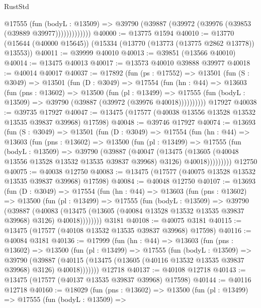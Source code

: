 \begin{lexlean}{RustStd}
\begin{coremodule}
                @17555
                  (fun (bodyL : @13509) =>
                  @39790 (@39887 (@39972 (@39976 (@39853 (@39889 @39977)))))))))))))
@40000 := @13775 @1594
@40010 := @13770 (@15644 (@40000 @15645)) (@15334 (@13770 (@13773 (@13775 @2862 @13778)) @13553))
@40011 := @39999 @40010
@40013 := @39851 (@13566 @40010)
@40014 := @13475 @40013
@40017 := @13573 @40010 @39888 @39977
@40018 := @40014 @40017
@40037 := @17892
    (fun (ps : @17552) =>
    @13501
      (fun (S : @3049) =>
      @13501
        (fun (D : @3049) =>
        @17554
          (fun (hn : @44) =>
          @13603
            (fun (pns : @13602) =>
            @13500
              (fun (pl : @13499) =>
              @17555 (fun (bodyL : @13509) => @39790 (@39887 (@39972 (@39976 @40018))))))))))
    @17927
@40038 := @39735 @17927
@40047 := @13475 (@17577 (@40038 @13556 @13528 @13532 @13535 @39837 @39968) @17598)
@40048 := @39746 @17927
@40074 := @13693
    (fun (S : @3049) =>
    @13501
      (fun (D : @3049) =>
      @17554
        (fun (hn : @44) =>
        @13603
          (fun (pns : @13602) =>
          @13500
            (fun (pl : @13499) =>
            @17555
              (fun (bodyL : @13509) =>
              @39790
                (@39887
                  (@40047
                    (@13475
                      (@13605 (@40048 @13556 @13528 @13532 @13535 @39837 @39968) @3126)
                      @40018)))))))))
    @12750
@40075 := @40038 @12750
@40083 := @13475 (@17577 (@40075 @13528 @13532 @13535 @39837 @39968) @17598)
@40084 := @40048 @12750
@40107 := @13693
    (fun (D : @3049) =>
    @17554
      (fun (hn : @44) =>
      @13603
        (fun (pns : @13602) =>
        @13500
          (fun (pl : @13499) =>
          @17555
            (fun (bodyL : @13509) =>
            @39790
              (@39887
                (@40083
                  (@13475 (@13605 (@40084 @13528 @13532 @13535 @39837 @39968) @3126) @40018))))))))
    @3181
@40108 := @40075 @3181
@40115 := @13475 (@17577 (@40108 @13532 @13535 @39837 @39968) @17598)
@40116 := @40084 @3181
@40136 := @17999
    (fun (hn : @44) =>
    @13603
      (fun (pns : @13602) =>
      @13500
        (fun (pl : @13499) =>
        @17555
          (fun (bodyL : @13509) =>
          @39790
            (@39887
              (@40115 (@13475 (@13605 (@40116 @13532 @13535 @39837 @39968) @3126) @40018)))))))
    @12718
@40137 := @40108 @12718
@40143 := @13475 (@17577 (@40137 @13535 @39837 @39968) @17598)
@40144 := @40116 @12718
@40160 := @18029
    (fun (pns : @13602) =>
    @13500
      (fun (pl : @13499) =>
      @17555
        (fun (bodyL : @13509) =>

\end{coremodule}
\end{lexlean}
